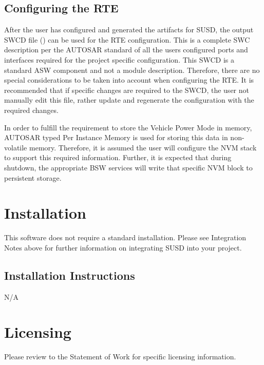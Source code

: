 \subsection{Configuring the RTE}
After the user has configured and generated the artifacts for SUSD, the output SWCD file \linebreak() can be used for the RTE configuration.
This is a complete SWC description per the AUTOSAR standard of all the users configured ports and interfaces required for the project specific configuration.
This SWCD is a standard ASW component and not a module description.
Therefore, there are no special considerations to be taken into account when configuring the RTE.
It is recommended that if specific changes are required to the SWCD, the user not manually edit this file, rather update and regenerate the configuration with the required changes.

In order to fulfill the requirement to store the Vehicle Power Mode in memory, AUTOSAR typed Per Instance Memory is used for storing this data in non-volatile memory.
Therefore, it is assumed the user will configure the NVM stack to support this required information.
Further, it is expected that during shutdown, the appropriate BSW services will write that specific NVM block to persistent storage.

\section{Installation}
This software does not require a standard installation. 
Please see Integration Notes above for further information on integrating SUSD into your project.

\subsection{Installation Instructions}
N/A

\section{Licensing}
Please review to the Statement of Work for specific licensing information.